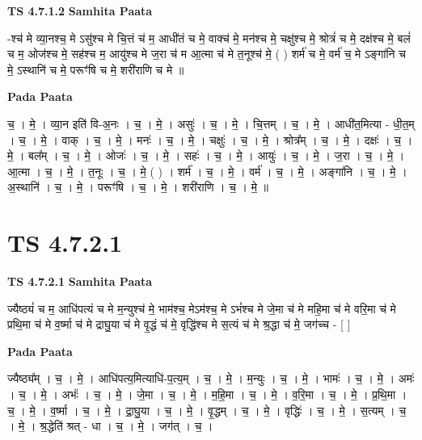 \documentclass[17pt]{extarticle}
\begin{document}
\textbf{TS 4.7.1.2 } \newline
\textbf{Samhita Paata} \newline

-श्च॑ मे व्या॒नश्च॒ मे ऽसु॑श्च मे चि॒त्तं च॑ म॒ आधी॑तं च मे॒ वाक्च॑ मे॒ मन॑श्च मे॒ चक्षु॑श्च मे॒ श्रोत्रं॑ च मे॒ दक्ष॑श्च मे॒ बलं॑ च म॒ ओज॑श्च मे॒ सह॑श्च म॒ आयु॑श्च मे ज॒रा च॑ म आ॒त्मा च॑ मे त॒नूश्च॑ मे॒ ( ) शर्म॑ च मे॒ वर्म॑ च॒ मे ऽङ्गा॑नि च मे॒ ऽस्थानि॑ च मे॒ परूꣳ॑षि च मे॒ शरी॑राणि च मे ॥ \newline

\textbf{Pada Paata} \newline

च॒ । मे॒ । व्या॒न इति॑ वि-अ॒नः । च॒ । मे॒ । असुः॑ । च॒ । मे॒ । चि॒त्तम् । च॒ । मे॒ । आधी॑त॒मित्या - धी॒त॒म् । च॒ । मे॒ । वाक् । च॒ । मे॒ । मनः॑ । च॒ । मे॒ । चक्षुः॑ । च॒ । मे॒ । श्रोत्र᳚म् । च॒ । मे॒ । दक्षः॑ । च॒ । मे॒ । बल᳚म् । च॒ । मे॒ । ओजः॑ । च॒ । मे॒ । सहः॑ । च॒ । मे॒ । आयुः॑ । च॒ । मे॒ । ज॒रा । च॒ । मे॒ । आ॒त्मा । च॒ । मे॒ । त॒नूः । च॒ । मे॒ ( ) । शर्म॑ । च॒ । मे॒ । वर्म॑ । च॒ । मे॒ । अङ्गा॑नि । च॒ । मे॒ । अ॒स्थानि॑ । च॒ । मे॒ । परूꣳ॑षि । च॒ । मे॒ । शरी॑राणि । च॒ । मे॒ ॥  \newline





\section{ TS 4.7.2.1 }

\textbf{TS 4.7.2.1 } \newline
\textbf{Samhita Paata} \newline

ज्यैष्ठ्यं॑ च म॒ आधि॑पत्यं च मे म॒न्युश्च॑ मे॒ भाम॑श्च॒ मेऽम॑श्च॒ मे ऽभं॑श्च मे जे॒मा च॑ मे महि॒मा च॑ मे वरि॒मा च॑ मे      प्रथि॒मा च॑ मे व॒र्ष्मा च॑ मे द्राघु॒या च॑ मे वृ॒द्धं च॑ मे॒      वृद्धि॑श्च मे स॒त्यं च॑ मे श्र॒द्धा च॑ मे॒ जग॑च्च - [  ] \newline

\textbf{Pada Paata} \newline

ज्यैष्ठ्य᳚म् । च॒ । मे॒ । आधि॑पत्य॒मित्याधि॑-प॒त्य॒म् । च॒ । मे॒ । म॒न्युः । च॒ । मे॒ । भामः॑ । च॒ । मे॒ । अमः॑ । च॒ । मे॒ । अभंः॑ । च॒ । मे॒ । जे॒मा । च॒ । मे॒ । म॒हि॒मा । च॒ । मे॒ । व॒रि॒मा । च॒ । मे॒ । प्र॒थि॒मा । च॒ । मे॒ । व॒र्ष्मा । च॒ । मे॒ । द्रा॒घु॒या । च॒ । मे॒ । वृ॒द्धम् । च॒ । मे॒ । वृद्धिः॑ । च॒ । मे॒ । स॒त्यम् । च॒ । मे॒ । श्र॒द्धेति॑ श्रत् - धा । च॒ । मे॒ । जग॑त् । च॒ ।  \newline
\end{document}
